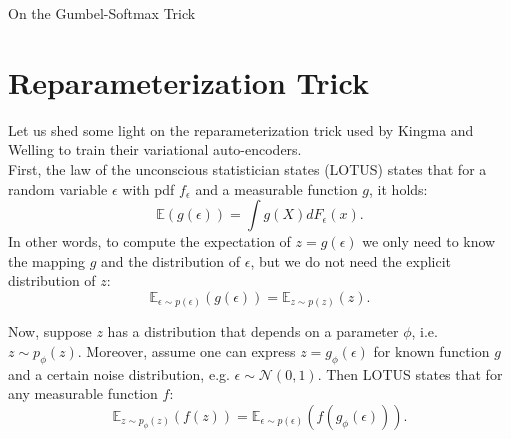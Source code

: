 \documentclass[11pt]{article}
\def\E{\mathbb{E}}
\def\eps{\epsilon}
\begin{document}
\begin{center}
{\LARGE On the Gumbel-Softmax Trick} 
\end{center}

\begin{abstract}
The reparameterization trick enables optimizing stochastic computation graphs via gradient descent \cite{KingmaW13}. The essence of the trick is to re-factor each stochastic node into a differentiable function of its parameters and a random variable with fixed distribution. After refactoring, the gradients of the loss propagated by the chain rule through the graph are low variance unbiased estimators of the gradients of the expected loss. While many continuous random variables have such re-parameterizations, discrete random variables lack useful reparameterizations due to the discontinuous nature of discrete states. As a remedy, the gumbel soft-max trick \cite{jang2016categorical} or concrete distribution \cite{MaddisonMT16} serves as a continuous relaxation of discrete random variables.
\end{abstract}

\section{Reparameterization Trick}

Let us shed some light on the reparameterization trick used by Kingma and Welling \cite{KingmaW13} to train their variational auto-encoders.\\

First, the law of the unconscious statistician states (LOTUS) states that for a random variable $\eps$ with pdf $f_\eps$ and a measurable function $g$, it holds:
\begin{equation}
\E(g(\eps)) = \int g(X) d F_\eps(x).
\end{equation}
In other words, to compute the expectation of $z = g(\eps)$ we only need to know the mapping $g$ and the distribution of $\epsilon$, but we do not need the explicit distribution of $z$:
\begin{equation}
\E_{\eps\sim p(\eps)}(g(\eps)) = \E_{z\sim p(z)}(z).
\end{equation}

Now, suppose $z$ has a distribution that depends on a parameter $\phi$, i.e. $z\sim p_\phi (z)$. Moreover, assume one can express $z = g_\phi(\eps)$ for known function $g$ and a certain noise distribution, e.g. $\eps\sim\mathcal{N}(0,1)$. Then LOTUS states that for any measurable function $f$:
\begin{equation}
\E_{z\sim p_\phi (z)}(f(z)) = \E_{\eps\sim p(\eps)}(f(g_\phi(\eps))).
\end{equation}
\end{document}
